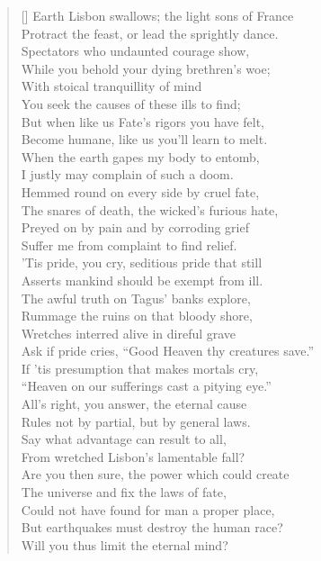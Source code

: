 \begin{verse}[\versewidth]
Earth Lisbon swallows; the light sons of France\\
Protract the feast, or lead the sprightly dance.\\
Spectators who undaunted courage show,\\
While you behold your dying brethren's woe;\\
With stoical tranquillity of mind\\
You seek the causes of these ills to find;\\
But when like us Fate's rigors you have felt,\\
Become humane, like us you'll learn to melt.\\
When the earth gapes my body to entomb,\\
I justly may complain of such a doom.\\
Hemmed round on every side by cruel fate,\\
The snares of death, the wicked's furious hate,\\
Preyed on by pain and by corroding grief\\
Suffer me from complaint to find relief.\\
'Tis pride, you cry, seditious pride that still\\
Asserts mankind should be exempt from ill.\\
The awful truth on Tagus' banks explore,\\
Rummage the ruins on that bloody shore,\\
Wretches interred alive in direful grave\\
Ask if pride cries, ``Good Heaven thy creatures save.''\\
If 'tis presumption that makes mortals cry,\\
``Heaven on our sufferings cast a pitying eye.''\\
All's right, you answer, the eternal cause\\
Rules not by partial, but by general laws.\\
Say what advantage can result to all,\\
From wretched Lisbon's lamentable fall?\\
Are you then sure, the power which could create\\
The universe and fix the laws of fate,\\
Could not have found for man a proper place,\\
But earthquakes must destroy the human race?\\
Will you thus limit the eternal mind?\\

\end{verse}
